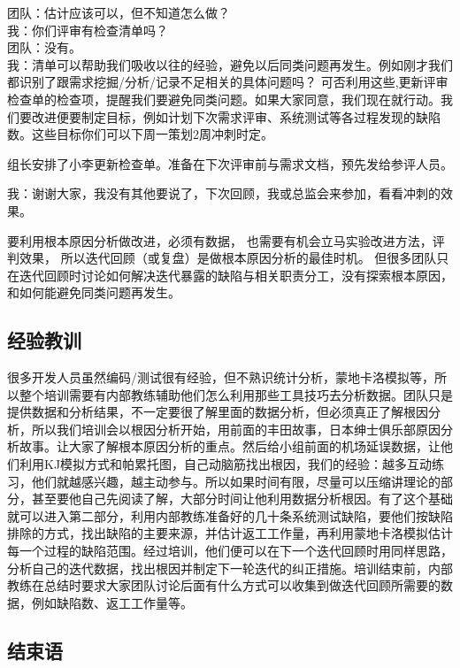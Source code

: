 团队：估计应该可以，但不知道怎么做？\\
我：你们评审有检查清单吗？\\
团队：没有。\\
我：清单可以帮助我们吸收以往的经验，避免以后同类问题再发生。例如刚才我们都识别了跟需求挖掘/分析/记录不足相关的具体问题吗？
可否利用这些,更新评审检查单的检查项，提醒我们要避免同类问题。如果大家同意，我们现在就行动。我们要改进便要制定目标，例如计划下次需求评审、系统测试等各过程发现的缺陷数。这些目标你们可以下周一策划2周冲刺时定。

组长安排了小李更新检查单。准备在下次评审前与需求文档，预先发给参评人员。

我：谢谢大家，我没有其他要说了，下次回顾，我或总监会来参加，看看冲刺的效果。

要利用根本原因分析做改进，必须有数据，
也需要有机会立马实验改进方法，评判效果，
所以迭代回顾（或复盘）是做根本原因分析的最佳时机。
但很多团队只在迭代回顾时讨论如何解决迭代暴露的缺陷与相关职责分工，没有探索根本原因，
和如何能避免同类问题再发生。

\hypertarget{ux7ecfux9a8cux6559ux8bad}{%
\subsection{经验教训}\label{ux7ecfux9a8cux6559ux8bad}}

很多开发人员虽然编码/测试很有经验，但不熟识统计分析，蒙地卡洛模拟等，所以整个培训需要有内部教练辅助他们怎么利用那些工具技巧去分析数据。团队只是提供数据和分析结果，不一定要很了解里面的数据分析，但必须真正了解根因分析，所以我们培训会以根因分析开始，用前面的丰田故事，日本绅士俱乐部原因分析故事。让大家了解根本原因分析的重点。然后给小组前面的机场延误数据，让他们利用KJ模拟方式和帕累托图，自己动脑筋找出根因，我们的经验：越多互动练习，他们就越感兴趣，越主动参与。所以如果时间有限，尽量可以压缩讲理论的部分，甚至要他自己先阅读了解，大部分时间让他利用数据分析根因。有了这个基础就可以进入第二部分，利用内部教练准备好的几十条系统测试缺陷，要他们按缺陷排除的方式，找出缺陷的主要来源，并估计返工工作量，再利用蒙地卡洛模拟估计每一个过程的缺陷范围。经过培训，他们便可以在下一个迭代回顾时用同样思路，分析自己的迭代数据，找出根因并制定下一轮迭代的纠正措施。培训结束前，内部教练在总结时要求大家团队讨论后面有什么方式可以收集到做迭代回顾所需要的数据，例如缺陷数、返工工作量等。

\hypertarget{ux7ed3ux675fux8bed}{%
\subsection{结束语}\label{ux7ed3ux675fux8bed}}

